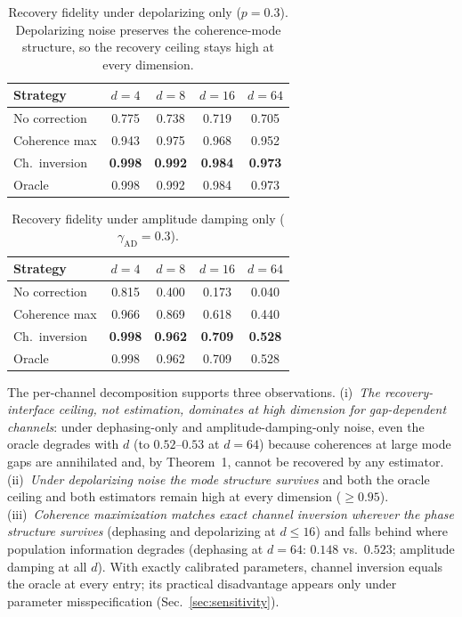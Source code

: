 \documentclass[a4paper,onecolumn]{quantumarticle}
\begin{document}
\begin{table}[!tb]
\caption{Recovery fidelity under depolarizing only ($p = 0.3$).
Depolarizing noise preserves the coherence-mode structure, so the recovery ceiling stays high at every dimension.}
\label{tab:depol_only}

\begin{tabular}{lcccc}
Strategy & $d{=}4$ & $d{=}8$ & $d{=}16$ & $d{=}64$ \\
\hline
No correction   & 0.775 & 0.738 & 0.719 & 0.705 \\
Coherence max   & 0.943 & 0.975 & 0.968 & 0.952 \\
Ch.\ inversion  & \textbf{0.998} & \textbf{0.992} & \textbf{0.984} & \textbf{0.973} \\
Oracle          & 0.998 & 0.992 & 0.984 & 0.973 \\
\end{tabular}

\end{table}

\begin{table}[!tb]
\caption{Recovery fidelity under amplitude damping only ($\gamma_\mathrm{AD} = 0.3$).}
\label{tab:ampdamp_only}

\begin{tabular}{lcccc}
Strategy & $d{=}4$ & $d{=}8$ & $d{=}16$ & $d{=}64$ \\
\hline
No correction   & 0.815 & 0.400 & 0.173 & 0.040 \\
Coherence max   & 0.966 & 0.869 & 0.618 & 0.440 \\
Ch.\ inversion  & \textbf{0.998} & \textbf{0.962} & \textbf{0.709} & \textbf{0.528} \\
Oracle          & 0.998 & 0.962 & 0.709 & 0.528 \\
\end{tabular}

\end{table}

The per-channel decomposition supports three observations.
(i)~\emph{The recovery-interface ceiling, not estimation, dominates at high dimension for gap-dependent channels}: under dephasing-only and amplitude-damping-only noise, even the oracle degrades with $d$ (to $0.52$--$0.53$ at $d = 64$) because coherences at large mode gaps are annihilated and, by Theorem~1, cannot be recovered by any estimator.
(ii)~\emph{Under depolarizing noise the mode structure survives} and both the oracle ceiling and both estimators remain high at every dimension ($\geq 0.95$).
(iii)~\emph{Coherence maximization matches exact channel inversion wherever the phase structure survives} (dephasing and depolarizing at $d \leq 16$) and falls behind where population information degrades (dephasing at $d = 64$: $0.148$ vs.\ $0.523$; amplitude damping at all $d$).
With exactly calibrated parameters, channel inversion equals the oracle at every entry; its practical disadvantage appears only under parameter misspecification (Sec.~\ref{sec:sensitivity}).
\end{document}

